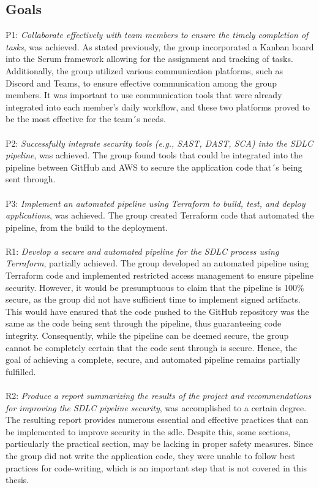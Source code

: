 \subsection{Goals}
P1: \textit{Collaborate effectively with team members to ensure the timely completion of tasks}, was achieved. As stated previously, the group incorporated a Kanban board into the Scrum framework allowing for the assignment and tracking of tasks. Additionally, the group utilized various communication platforms, such as Discord and Teams, to ensure effective communication among the group members. It was important to use communication tools that were already integrated into each member's daily workflow, and these two platforms proved to be the most effective for the team´s needs. 
\\~\\
P2: \textit{Successfully integrate security tools (e.g., SAST, DAST, SCA) into the SDLC pipeline}, was achieved. The group found tools that could be integrated into the pipeline between GitHub and AWS to secure the application code that´s being sent through.
\\~\\
P3: \textit{Implement an automated pipeline using Terraform to build, test, and deploy applications}, was achieved. The group created Terraform code that automated the pipeline, from the build to the deployment. 
\\~\\
R1: \textit{Develop a secure and automated pipeline for the SDLC process using Terraform}, partially achieved. The group developed an automated pipeline using Terraform code and implemented restricted access management to ensure pipeline security. However, it would be presumptuous to claim that the pipeline is 100\% secure, as the group did not have sufficient time to implement signed artifacts. This would have ensured that the code pushed to the GitHub repository was the same as the code being sent through the pipeline, thus guaranteeing code integrity. Consequently, while the pipeline can be deemed secure, the group cannot be completely certain that the code sent through is secure. Hence, the goal of achieving a complete, secure, and automated pipeline remains partially fulfilled. 
\\~\\
R2: \textit{Produce a report summarizing the results of the project and recommendations for improving the SDLC pipeline security}, was accomplished to a certain degree. The resulting report provides numerous essential and effective practices that can be implemented to improve security in the \acrshort{sdlc}. Despite this, some sections, particularly the practical section, may be lacking in proper safety measures. Since the group did not write the application code, they were unable to follow best practices for code-writing, which is an important step that is not covered in this thesis.   







